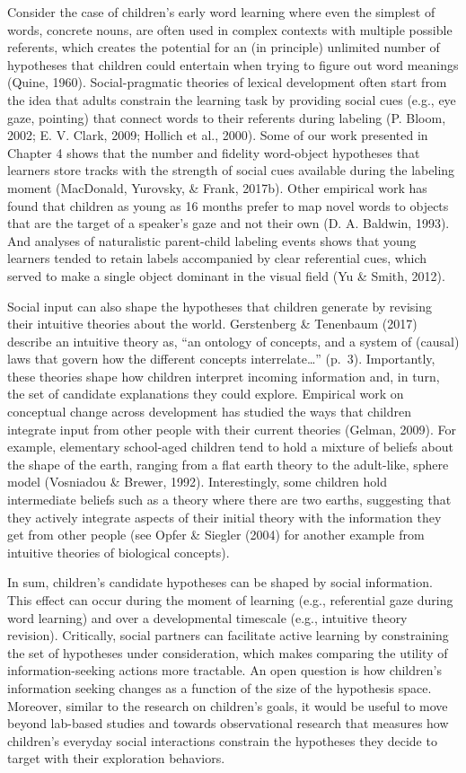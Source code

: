 \documentclass[oneside]{report}
\begin{document}
Consider the case of children's early word learning where even the
simplest of words, concrete nouns, are often used in complex contexts
with multiple possible referents, which creates the potential for an (in
principle) unlimited number of hypotheses that children could entertain
when trying to figure out word meanings (Quine, 1960). Social-pragmatic
theories of lexical development often start from the idea that adults
constrain the learning task by providing social cues (e.g., eye gaze,
pointing) that connect words to their referents during labeling (P.
Bloom, 2002; E. V. Clark, 2009; Hollich et al., 2000). Some of our work
presented in Chapter 4 shows that the number and fidelity word-object
hypotheses that learners store tracks with the strength of social cues
available during the labeling moment (MacDonald, Yurovsky, \& Frank,
2017b). Other empirical work has found that children as young as 16
months prefer to map novel words to objects that are the target of a
speaker's gaze and not their own (D. A. Baldwin, 1993). And analyses of
naturalistic parent-child labeling events shows that young learners
tended to retain labels accompanied by clear referential cues, which
served to make a single object dominant in the visual field (Yu \&
Smith, 2012).

Social input can also shape the hypotheses that children generate by
revising their intuitive theories about the world. Gerstenberg \&
Tenenbaum (2017) describe an intuitive theory as, ``an ontology of
concepts, and a system of (causal) laws that govern how the different
concepts interrelate\ldots{}'' (p.~3). Importantly, these theories shape
how children interpret incoming information and, in turn, the set of
candidate explanations they could explore. Empirical work on conceptual
change across development has studied the ways that children integrate
input from other people with their current theories (Gelman, 2009). For
example, elementary school-aged children tend to hold a mixture of
beliefs about the shape of the earth, ranging from a flat earth theory
to the adult-like, sphere model (Vosniadou \& Brewer, 1992).
Interestingly, some children hold intermediate beliefs such as a theory
where there are two earths, suggesting that they actively integrate
aspects of their initial theory with the information they get from other
people (see Opfer \& Siegler (2004) for another example from intuitive
theories of biological concepts).

In sum, children's candidate hypotheses can be shaped by social
information. This effect can occur during the moment of learning (e.g.,
referential gaze during word learning) and over a developmental
timescale (e.g., intuitive theory revision). Critically, social partners
can facilitate active learning by constraining the set of hypotheses
under consideration, which makes comparing the utility of
information-seeking actions more tractable. An open question is how
children's information seeking changes as a function of the size of the
hypothesis space. Moreover, similar to the research on children's goals,
it would be useful to move beyond lab-based studies and towards
observational research that measures how children's everyday social
interactions constrain the hypotheses they decide to target with their
exploration behaviors.
\end{document}

